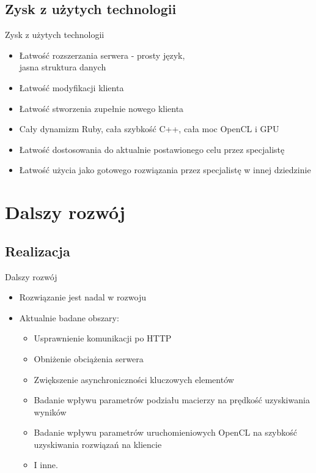 \documentclass[12pt]{beamer}
\begin{document}
\subsection{Zysk z użytych technologii}
\begin{frame}{Zysk z użytych technologii}
\begin{itemize}
	\item Łatwość rozszerzania serwera - prosty język,\\ jasna struktura danych
	\item Łatwość modyfikacji klienta
	\item Łatwość stworzenia zupełnie nowego klienta
	\item Cały dynamizm Ruby, cała szybkość C++, cała moc OpenCL i GPU
	\item Łatwość dostosowania do aktualnie postawionego celu przez specjalistę
	\item Łatwość użycia jako gotowego rozwiązania przez specjalistę w innej dziedzinie
\end{itemize}
\end{frame}

\section{Dalszy rozwój}
\subsection{Realizacja}
\begin{frame}{Dalszy rozwój}
\begin{itemize}
	\item Rozwiązanie jest nadal w rozwoju
	\item Aktualnie badane obszary:
	\begin{itemize}
		\item Usprawnienie komunikacji po HTTP
		\item Obniżenie obciążenia serwera
		\item Zwiększenie asynchroniczności kluczowych elementów
		\item Badanie wpływu parametrów podziału macierzy na prędkość uzyskiwania wyników
		\item Badanie wpływu parametrów uruchomieniowych OpenCL na szybkość uzyskiwania rozwiązań na kliencie
		\item I inne.
	\end{itemize}
\end{itemize}
\end{frame}
\end{document}
